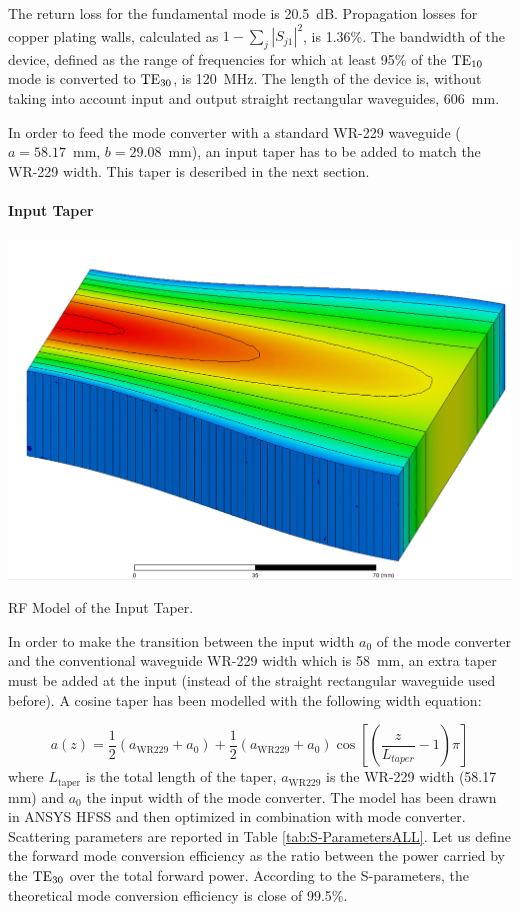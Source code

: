 The return loss for the fundamental mode is 20.5~dB. Propagation losses for copper plating walls, calculated as $1-\sum_{j}\left|S_{j1}\right|^{2}$, is 1.36\%. The bandwidth of the device, defined as the range of frequencies for which at least 95\% of the ${\mathrm{TE}}_{10}$ mode is converted to ${\mathrm{TE}}_{30}$, is 120~MHz.
The length of the device is, without taking into account input and output straight rectangular waveguides, 606~mm.


In order to feed the mode converter with a standard WR-229 waveguide ($a=58.17$~mm, $b=29.08$~mm), 
an input taper has to be added to match the WR-229 width. This taper is described in the next section.

\paragraph{Input Taper}
\begin{marginfigure}
	\includegraphics[width=1.0\textwidth]{figures/chap3/ITER_modeconverter/HFSS_ModeConverterTaper}
	\caption{RF Model of the Input Taper. }
	\label{fig:taper}
\end{marginfigure}
In order to make the transition between the input width $a_{0}$ of the mode converter and the conventional waveguide WR-229 width which is 58~mm, an extra taper must be added at the input (instead of the straight rectangular waveguide used before). A cosine taper has been modelled with the following width equation:

\begin{equation}
a(z)=\frac{1}{2} 
\left(a_{\mbox{WR229}}+a_{0}\right)
+\frac{1}{2}\left(a_{\mbox{WR229}}+a_{0}\right)
\cos\left[\left(\frac{z}{L_{taper}}-1\right)\pi\right]
\end{equation}
where $L_{\mbox{taper}}$ is the total length of the taper, $a_{\mbox{WR229}}$ is the WR-229 width (58.17\,mm) and $a_{0}$ the input width of the mode converter. The model has been drawn in ANSYS HFSS and then optimized in combination with mode converter. Scattering parameters are reported in Table \ref{tab:S-ParametersALL}. Let us define the forward mode conversion efficiency as the ratio between the power carried by the ${\mathrm{TE}}_{30}$ over the total forward power. According to the S-parameters, the theoretical mode conversion efficiency is close of 99.5\%. 

